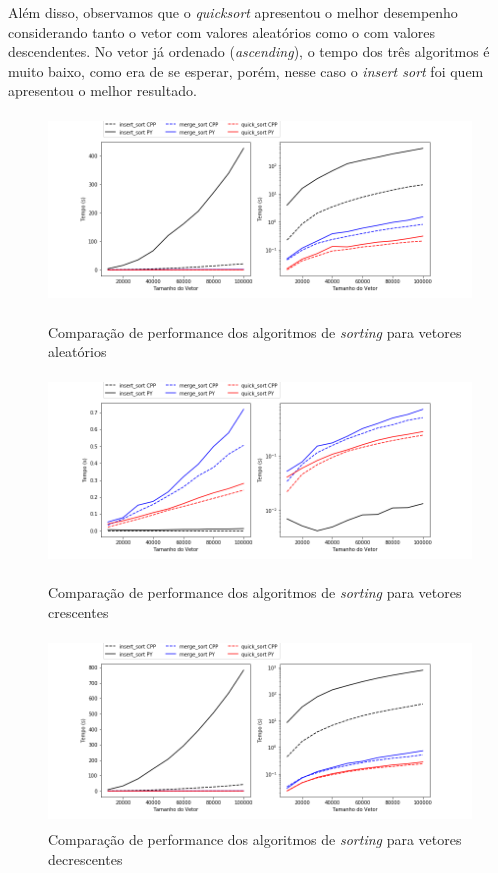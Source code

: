 \documentclass{article}
\begin{document}
Além disso, observamos que o {\it quicksort} apresentou o melhor
desempenho considerando tanto o vetor com valores aleatórios como o com
valores descendentes.
No vetor já ordenado ({\it ascending}), o tempo dos três algoritmos é muito baixo, como
era de se esperar, porém, nesse caso o {\it insert sort} foi quem apresentou o melhor
resultado.


  \begin{figure}[!h]
  \centering
  \includegraphics[width=0.8\linewidth,height=5cm]{SortTime_Random.png}
    \caption{Comparação de performance dos algoritmos de {\it sorting} para vetores aleatórios}
    \vspace{0.5cm}
  \includegraphics[width=0.8\linewidth,height=5cm]{SortTime_Ascending.png}
    \caption{Comparação de performance dos algoritmos de {\it sorting} para vetores crescentes}
    \vspace{0.5cm}
  \includegraphics[width=0.8\linewidth,height=5cm]{SortTime_Descending.png}
    \caption{Comparação de performance dos algoritmos de {\it sorting} para vetores decrescentes}
  \end{figure}

\end{document}
